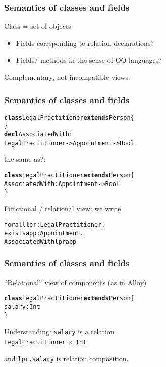 \documentclass{beamer}
\begin{document}
\begin{frame}[fragile]\frametitle{Semantics of classes and fields}

   Class = set of objects

  \begin{itemize}
  \item Fields corrsponding to relation declarations?
  \item Fields/ methods in the sense of OO languages?
  \end{itemize}
  Complementary, not incompatible views.

\end{frame}


\begin{frame}[fragile]\frametitle{Semantics of classes and fields}


\begin{alltt}
\textbf{class} LegalPractitioner \textbf{extends} Person \{
\}
\textbf{decl} AssociatedWith:
     LegalPractitioner -> Appointment -> Bool
\end{alltt}
  
the same as?:

\begin{alltt}
\textbf{class} LegalPractitioner \textbf{extends} Person \{
    AssociatedWith: Appointment -> Bool
\}
\end{alltt}

Functional / relational view: we write

\begin{alltt}
  forall lpr  : LegalPractitioner.
  exists app: Appointment.
     AssociatedWith lpr app
\end{alltt}

\end{frame}


\begin{frame}[fragile]\frametitle{Semantics of classes and fields}



  ``Relational'' view of components (as in Alloy)
\begin{alltt}
\textbf{class} LegalPractitioner \textbf{extends} Person \{
    salary: Int
\}
\end{alltt}

Understanding: \texttt{salary} is a relation\\
\texttt{LegalPractitioner} $\times$ \texttt{Int}

and \texttt{lpr.salary} is relation composition.

\end{frame}
\end{document}
